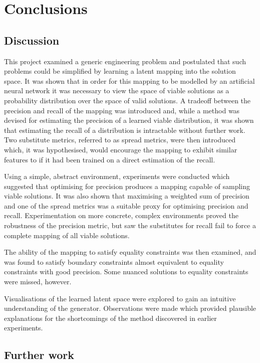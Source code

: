 \documentclass[../../main.tex]{subfiles}
\begin{document}
\chapter{Conclusions}

\section{Discussion}

This project examined a generic engineering problem and postulated that such problems could be simplified by learning a latent mapping into the solution space.
It was shown that in order for this mapping to be modelled by an artificial neural network it was necessary to view the space of viable solutions as a probability distribution over the space of valid solutions.
A tradeoff between the precision and recall of the mapping was introduced and, while a method was devised for estimating the precision of a learned viable distribution, it was shown that estimating the recall of a distribution is intractable without further work.
Two substitute metrics, referred to as spread metrics, were then introduced which, it was hypothesised, would encourage the mapping to exhibit similar features to if it had been trained on a direct estimation of the recall.

Using a simple, abstract environment, experiments were conducted which suggested that optimising for precision produces a mapping capable of sampling viable solutions.
It was also shown that maximising a weighted sum of precision and one of the spread metrics was a suitable proxy for optimising precision and recall.
Experimentation on more concrete, complex environments proved the robustness of the precision metric, but saw the substitutes for recall fail to force a complete mapping of all viable solutions.

The ability of the mapping to satisfy equality constraints was then examined, and was found to satisfy boundary constraints almost equivalent to equality constraints with good precision.
Some nuanced solutions to equality constraints were missed, however.

Visualisations of the learned latent space were explored to gain an intuitive understanding of the generator.
Observations were made which provided plausible explanations for the shortcomings of the method discovered in earlier experiments.

\section{Further work}
\end{document}
